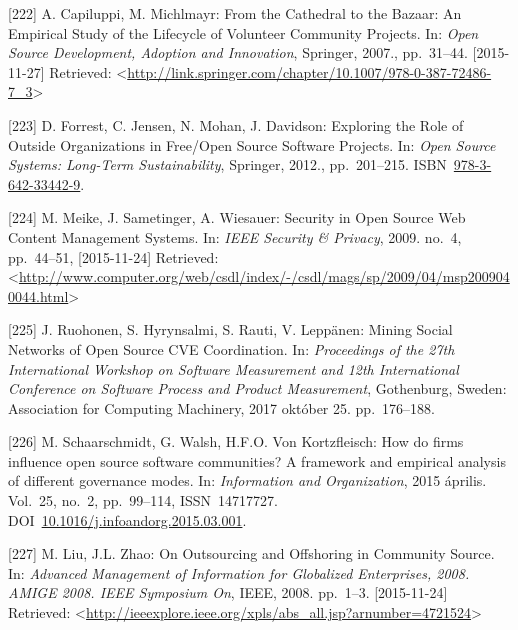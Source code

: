 \documentclass[12pt,magyar,a4paper,oneside]{scrreprt}
\newenvironment{cslreferences}%
  {}%
  {\par}
\begin{document}
\begin{cslreferences}
\leavevmode\hypertarget{ref-capiluppi_cathedral_2007}{}%
{[}222{]} A. Capiluppi, M. Michlmayr: From the Cathedral to the Bazaar:
An Empirical Study of the Lifecycle of Volunteer Community Projects. In:
\emph{Open Source Development, Adoption and Innovation}, Springer,
2007., pp.~31--44. {[}2015-11-27{]} Retrieved:
\textless{}\url{http://link.springer.com/chapter/10.1007/978-0-387-72486-7_3}\textgreater{}

\leavevmode\hypertarget{ref-forrest_exploring_2012}{}%
{[}223{]} D. Forrest, C. Jensen, N. Mohan, J. Davidson: Exploring the
Role of Outside Organizations in Free/Open Source Software Projects. In:
\emph{Open Source Systems: Long-Term Sustainability}, Springer, 2012.,
pp.~201--215.
ISBN~\href{https://worldcat.org/isbn/978-3-642-33442-9}{978-3-642-33442-9}.

\leavevmode\hypertarget{ref-meike_security_2009}{}%
{[}224{]} M. Meike, J. Sametinger, A. Wiesauer: Security in Open Source
Web Content Management Systems. In: \emph{IEEE Security \& Privacy},
2009. no.~4, pp.~44--51, {[}2015-11-24{]} Retrieved:
\textless{}\url{http://www.computer.org/web/csdl/index/-/csdl/mags/sp/2009/04/msp2009040044.html}\textgreater{}

\leavevmode\hypertarget{ref-ruohonen_mining_2017}{}%
{[}225{]} J. Ruohonen, S. Hyrynsalmi, S. Rauti, V. Leppänen: Mining
Social Networks of Open Source CVE Coordination. In: \emph{Proceedings
of the 27th International Workshop on Software Measurement and 12th
International Conference on Software Process and Product Measurement},
Gothenburg, Sweden: Association for Computing Machinery, 2017 október
25. pp.~176--188.

\leavevmode\hypertarget{ref-schaarschmidt_how_2015}{}%
{[}226{]} M. Schaarschmidt, G. Walsh, H.F.O. Von Kortzfleisch: How do
firms influence open source software communities? A framework and
empirical analysis of different governance modes. In: \emph{Information
and Organization}, 2015 április. Vol.~25, no.~2, pp.~99--114,
ISSN~14717727.
DOI~\href{https://doi.org/10.1016/j.infoandorg.2015.03.001}{10.1016/j.infoandorg.2015.03.001}.

\leavevmode\hypertarget{ref-liu_outsourcing_2008}{}%
{[}227{]} M. Liu, J.L. Zhao: On Outsourcing and Offshoring in Community
Source. In: \emph{Advanced Management of Information for Globalized
Enterprises, 2008. AMIGE 2008. IEEE Symposium On}, IEEE, 2008. pp.~1--3.
{[}2015-11-24{]} Retrieved:
\textless{}\url{http://ieeexplore.ieee.org/xpls/abs_all.jsp?arnumber=4721524}\textgreater{}


\end{cslreferences}
\end{document}
